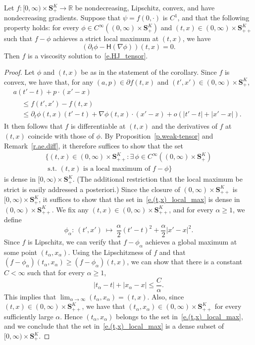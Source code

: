\documentclass[AHL,Unicode,longabstracts,published]{cedram}
\newcommand{\R}{\mathbb{R}}
\renewcommand{\S}{\mathbf{S}}
\renewcommand{\H}{\mathsf{H}}
\renewcommand{\leq}{\leqslant}
\renewcommand{\geq}{\geqslant}
\newcommand{\Ll}{\left}
\newcommand{\Rr}{\right}
\let\oldexists\exists
\renewcommand*{\exists}{\mathrel{\oldexists}}
\begin{document}
\begin{coro}\label{c.vis}
Let $f : [0,\infty) \times \S^K_+ \to \R$ be nondecreasing, Lipschitz, convex, and have nondecreasing gradients. Suppose that $\psi=f(0,\cdot)$ is $C^1$, and that the following property holds: for every $\phi \in C^\infty((0,\infty)\times\S^K_+)$ and $(t,x) \in (0,\infty)\times\S^K_{++}$ such that $f-\phi$ achieves a strict local maximum at $(t,x)$, we have
\begin{equation*}
\Ll(\partial_t\phi-\H\Ll(\nabla\phi\Rr)\Rr)(t,x)=0.
\end{equation*}
Then $f$ is a viscosity solution to~\eqref{e.HJ_tensor}.
\end{coro}
\begin{proof}
Let $\phi$ and $(t,x)$ be as in the statement of the corollary. Since $f$ is convex, we have that, for any $(a,p)\in\partial f(t,x)$ and $(t',x')\in(0,\infty)\times\S^K_+$,
\begin{multline*}
a\Ll(t'-t\Rr)+p\cdot\Ll(x'-x\Rr)\\
\begin{aligned}
&\leq f\Ll(t',x'\Rr)-f(t,x)\\
&\leq\partial_t\phi(t,x)\Ll(t'-t\Rr)+\nabla \phi(t,x)\cdot \Ll(x'-x\Rr)+o\Ll(\Ll|t'-t\Rr|+\Ll|x'-x\Rr|\Rr).
\end{aligned}
\end{multline*}
It then follows that $f$ is differentiable at $(t,x)$ and the derivatives of $f$ at $(t,x)$ coincide with those of $\phi$. By Proposition~\ref{p.weak-tensor} {and Remark~\ref{r.ae.diff}}, it {therefore} suffices to show that the set
\begin{multline}\label{e.(t,x)_local_max}
\Big\{(t,x)\in(0,\infty)\times\S^K_{++}:\exists\, \phi\in C^\infty\Ll((0,\infty)\times \S^K_{+}\Rr)\\
\text{ s.t. }(t,x)\text{ is a local maximum of }f-\phi\Big\}
\end{multline}
is dense in $[0,\infty)\times \S^K_+$. (The additional restriction that the local maximum be strict is easily addressed a posteriori.) {Since the closure of $(0,\infty)\times \S^K_{++}$ is $[0,\infty)\times\S^K_+$, it suffices to show that the set in~\eqref{e.(t,x)_local_max} is dense in $(0,\infty)\times \S^K_{++}$.} We fix any $(t,x)\in (0,\infty)\times\S^K_{++}$, and for every $\alpha\geq 1$, we define
\[
\phi_\alpha:\ \Ll(t',x'\Rr)\ \mapsto \ \frac{\alpha}{2}\Ll(t'-t\Rr)^2+\frac{\alpha}{2}\Ll|x'-x\Rr|^2.
\]
Since $f$ is Lipschitz, we can verify that $f-\phi_\alpha$ achieves a global maximum at some point $(t_\alpha, x_\alpha)$. Using the Lipschitzness of $f$ and that $(f-\phi_\alpha)(t_\alpha,x_\alpha)\geq (f-\phi_\alpha)(t,x)$, we can show that there is a constant $C<\infty$ such that for every $\alpha\geq 1$,
\[
\Ll|t_\alpha-t\Rr|+\Ll|x_\alpha-x\Rr|\leq \frac{C}{\alpha}.
\]
This implies that $\lim_{\alpha\to\infty}(t_\alpha,x_\alpha)= (t,x)$. Also, since $(t,x)\in (0,\infty)\times\S^K_{++}$, we have that $(t_\alpha,x_\alpha)\in (0,\infty)\times\S^K_{++}$ for every sufficiently large $\alpha$. Hence $(t_\alpha,x_\alpha)$ belongs to the set in~\eqref{e.(t,x)_local_max}, and we conclude that the set in~\eqref{e.(t,x)_local_max} is a dense subset of $[0,\infty)\times \S^K_+$.
\end{proof}
\end{document}
